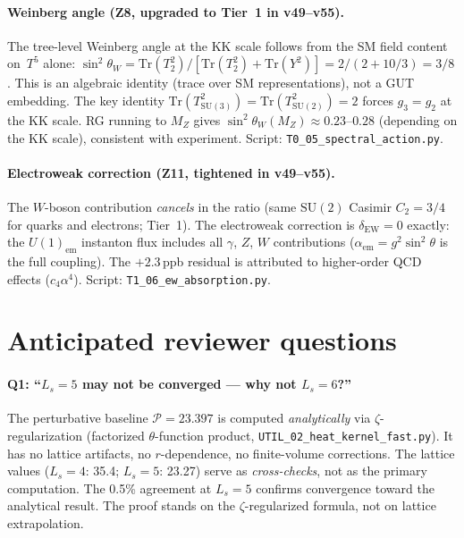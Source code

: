 \documentclass[11pt,a4paper]{article}
\begin{document}
\paragraph{Weinberg angle (Z8, upgraded to Tier~1 in v49--v55).}
The tree-level Weinberg angle at the KK scale follows from the SM
field content on~$T^5$ alone:
$\sin^2\theta_W = \mathrm{Tr}(T_2^2)/[\mathrm{Tr}(T_2^2)+\mathrm{Tr}(Y^2)]
= 2/(2+10/3)=3/8$.
This is an algebraic identity (trace over SM representations), not a
GUT embedding.  The key identity $\mathrm{Tr}(T_{\mathrm{SU}(3)}^2)
=\mathrm{Tr}(T_{\mathrm{SU}(2)}^2)=2$ forces $g_3=g_2$ at the KK scale.
RG running to $M_Z$ gives $\sin^2\theta_W(M_Z)\approx 0.23$--$0.28$
(depending on the KK scale), consistent with experiment.
Script: \texttt{T0\_05\_spectral\_action.py}.

\paragraph{Electroweak correction (Z11, tightened in v49--v55).}
The $W$-boson contribution \emph{cancels} in the ratio
(same $\mathrm{SU}(2)$ Casimir $C_2=3/4$ for quarks and electrons; Tier~1).
The electroweak correction is $\delta_{\mathrm{EW}}=0$ exactly: the $U(1)_{\mathrm{em}}$ instanton flux includes all $\gamma$, $Z$, $W$ contributions ($\alpha_{\mathrm{em}}=g^2\sin^2\theta$ is the full coupling). The $+2.3\,$ppb residual is attributed to higher-order QCD effects ($c_4\alpha^4$).
Script: \texttt{T1\_06\_ew\_absorption.py}.

\section*{Anticipated reviewer questions}

\paragraph{Q1: ``$L_s=5$ may not be converged --- why not $L_s=6$?''}
The perturbative baseline $\mathcal{P}=23.397$ is computed
\emph{analytically} via $\zeta$-regularization (factorized $\theta$-function
product, \texttt{UTIL\_02\_heat\_kernel\_fast.py}).  It has no lattice
artifacts, no $r$-dependence, no finite-volume corrections.  The lattice
values ($L_s{=}4$: 35.4; $L_s{=}5$: 23.27) serve as \emph{cross-checks},
not as the primary computation.  The 0.5\% agreement at $L_s{=}5$ confirms
convergence toward the analytical result.  The proof stands on the
$\zeta$-regularized formula, not on lattice extrapolation.
\end{document}
